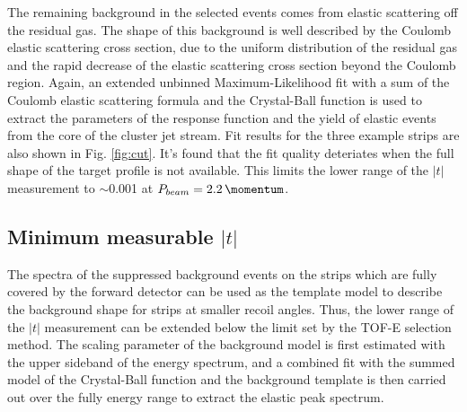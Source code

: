 \documentclass[number,5p]{elsarticle}
\begin{document}
The remaining background in the selected events comes from elastic scattering off the residual gas.
The shape of this background is well described by the Coulomb elastic scattering cross
section, due to the uniform distribution of the residual gas and the rapid decrease of the elastic scattering cross section beyond the Coulomb region.
Again, an extended unbinned Maximum-Likelihood fit with a sum of the Coulomb elastic scattering formula and the Crystal-Ball
function is used to extract the parameters of the response function and the
yield of elastic events from the core of the cluster jet stream. 
Fit results for the three example strips are also shown in Fig. \ref{fig:cut}.
It's found that the fit quality deteriates when the full shape of the target profile is not available.
This limits the lower range of the $|t|$ measurement to $\sim$\SI{0.001}{\tmom} at $P_{beam}=\SI{2.2}{\momentum}$.

\subsection{Minimum measurable $|t|$}
\label{sec:minimum_t}
The spectra of the suppressed background events on the strips which are fully covered by the
forward detector can be used as the template model to describe the background
shape for strips at smaller recoil angles.
Thus, the lower range of the $|t|$ measurement can be extended below the limit set by the TOF-E selection method.
The scaling parameter of the background model is first estimated with the upper
sideband of the energy spectrum, and a combined fit with the summed
model of the Crystal-Ball function and the background template is then carried
out over the fully energy range to extract the elastic peak spectrum.
\end{document}
